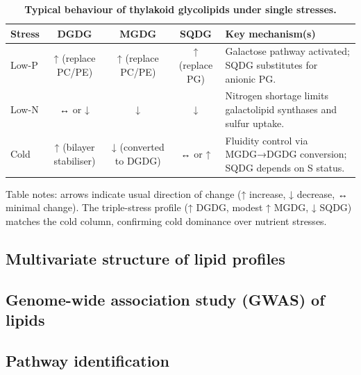 \documentclass[10pt,letterpaper]{article}
\begin{document}
\begin{table}[!ht]
  \begin{adjustwidth}{-2.25in}{0in}  %
    \centering
    \caption{{\bf Typical behaviour of thylakoid glycolipids under single stresses.}}
    \begin{tabular}{|l|c|c|c|p{3.8in}|}
      \hline
      \textbf{Stress} & \textbf{DGDG} & \textbf{MGDG} & \textbf{SQDG} &
      \textbf{Key mechanism(s)} \\ \hline
      Low-P  & ↑ (replace PC/PE) & ↑ (replace PC/PE) & ↑ (replace PG) &
      Galactose pathway activated; SQDG substitutes for anionic PG. \\ \hline
      Low-N  & ↔ or ↓ & ↓ & ↓ &
      Nitrogen shortage limits galactolipid synthases and sulfur uptake. \\ \hline
      Cold   & ↑ (bilayer stabiliser) & ↓ (converted to DGDG) & ↔ or ↑ &
      Fluidity control via MGDG→DGDG conversion; SQDG depends on S status. \\ \hline
    \end{tabular}
    \begin{flushleft}
      Table notes: arrows indicate usual direction of change (↑ increase, ↓ decrease, ↔ minimal change).  
      The triple-stress profile (↑ DGDG, modest ↑ MGDG, ↓ SQDG) matches the cold column, confirming cold dominance over nutrient stresses.
    \end{flushleft}
    \label{table:triad_single_stress}
  \end{adjustwidth}
\end{table}




\subsection*{Multivariate structure of lipid profiles}

\subsection*{Genome-wide association study (GWAS) of lipids}

\subsection*{Pathway identification}
\end{document}
